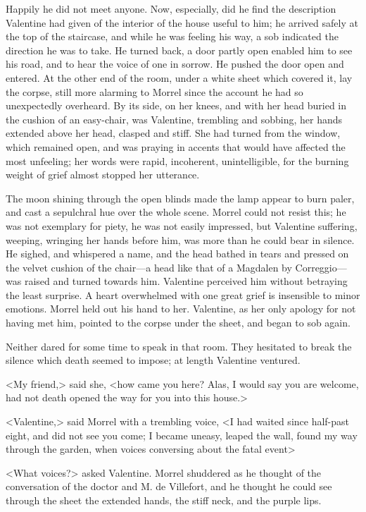  Happily he did not meet anyone. Now, especially, did he find the description Valentine had given of the interior of the house useful to him; he arrived safely at the top of the staircase, and while he was feeling his way, a sob indicated the direction he was to take. He turned back, a door partly open enabled him to see his road, and to hear the voice of one in sorrow. He pushed the door open and entered. At the other end of the room, under a white sheet which covered it, lay the corpse, still more alarming to Morrel since the account he had so unexpectedly overheard. By its side, on her knees, and with her head buried in the cushion of an easy-chair, was Valentine, trembling and sobbing, her hands extended above her head, clasped and stiff. She had turned from the window, which remained open, and was praying in accents that would have affected the most unfeeling; her words were rapid, incoherent, unintelligible, for the burning weight of grief almost stopped her utterance. 

 The moon shining through the open blinds made the lamp appear to burn paler, and cast a sepulchral hue over the whole scene. Morrel could not resist this; he was not exemplary for piety, he was not easily impressed, but Valentine suffering, weeping, wringing her hands before him, was more than he could bear in silence. He sighed, and whispered a name, and the head bathed in tears and pressed on the velvet cushion of the chair—a head like that of a Magdalen by Correggio—was raised and turned towards him. Valentine perceived him without betraying the least surprise. A heart overwhelmed with one great grief is insensible to minor emotions. Morrel held out his hand to her. Valentine, as her only apology for not having met him, pointed to the corpse under the sheet, and began to sob again. 

 Neither dared for some time to speak in that room. They hesitated to break the silence which death seemed to impose; at length Valentine ventured. 

 <My friend,> said she, <how came you here? Alas, I would say you are welcome, had not death opened the way for you into this house.> 

 <Valentine,> said Morrel with a trembling voice, <I had waited since half-past eight, and did not see you come; I became uneasy, leaped the wall, found my way through the garden, when voices conversing about the fatal event\longdash> 

 <What voices?> asked Valentine. Morrel shuddered as he thought of the conversation of the doctor and M. de Villefort, and he thought he could see through the sheet the extended hands, the stiff neck, and the purple lips. 

